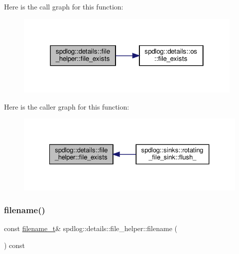 Here is the call graph for this function\+:
\nopagebreak
\begin{figure}[H]
\begin{center}
\leavevmode
\includegraphics[width=310pt]{classspdlog_1_1details_1_1file__helper_a8c5f69588e8a54f436c3565317c233bd_cgraph}
\end{center}
\end{figure}
Here is the caller graph for this function\+:
\nopagebreak
\begin{figure}[H]
\begin{center}
\leavevmode
\includegraphics[width=327pt]{classspdlog_1_1details_1_1file__helper_a8c5f69588e8a54f436c3565317c233bd_icgraph}
\end{center}
\end{figure}
\mbox{\label{classspdlog_1_1details_1_1file__helper_a76610058a1769b25bd6ed52a1443b552}} 
\subsubsection{\texorpdfstring{filename()}{filename()}}
{\footnotesize\ttfamily const \hyperlink{namespacespdlog_acf7ce125b3622e44f8f1702d699e0b06}{filename\+\_\+t}\& spdlog\+::details\+::file\+\_\+helper\+::filename (\begin{DoxyParamCaption}{ }\end{DoxyParamCaption}) const\hspace{0.3cm}{\ttfamily [inline]}}



